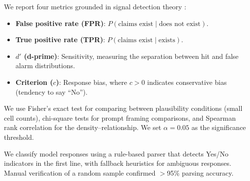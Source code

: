 We report four metrics grounded in signal detection theory \cite{green1966signal}:

\begin{itemize}[leftmargin=*,itemsep=0pt,topsep=0pt]
    \item \textbf{False positive rate (FPR)}: $P(\text{claims exist} \mid \text{does not exist})$.
    \item \textbf{True positive rate (TPR)}: $P(\text{claims exist} \mid \text{exists})$.
    \item \textbf{$d'$ (d-prime)}: Sensitivity, measuring the separation between hit and false alarm distributions.
    \item \textbf{Criterion ($c$)}: Response bias, where $c > 0$ indicates conservative bias (tendency to say ``No'').
\end{itemize}

We use Fisher's exact test for comparing \fpr between plausibility conditions (small cell counts), chi-square tests for prompt framing comparisons, and Spearman rank correlation for the density--\fpr relationship.
We set $\alpha = 0.05$ as the significance threshold.

We classify model responses using a rule-based parser that detects Yes/No indicators in the first line, with fallback heuristics for ambiguous responses. Manual verification of a random sample confirmed $>$95\% parsing accuracy.
